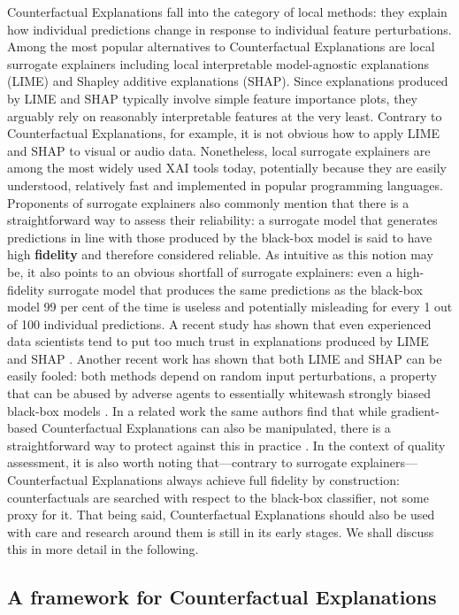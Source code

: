 \documentclass{juliacon}
\begin{document}
Counterfactual Explanations fall into the category of local methods:
they explain how individual predictions change in response to individual
feature perturbations. Among the most popular alternatives to
Counterfactual Explanations are local surrogate explainers including
local interpretable model-agnostic explanations (LIME) and Shapley
additive explanations (SHAP). Since explanations produced by LIME and
SHAP typically involve simple feature importance plots, they arguably
rely on reasonably interpretable features at the very least. Contrary to
Counterfactual Explanations, for example, it is not obvious how to apply
LIME and SHAP to visual or audio data. Nonetheless, local surrogate
explainers are among the most widely used XAI tools today, potentially
because they are easily understood, relatively fast and implemented in
popular programming languages. Proponents of surrogate explainers also
commonly mention that there is a straightforward way to assess their
reliability: a surrogate model that generates predictions in line with
those produced by the black-box model is said to have high
\textbf{fidelity} and therefore considered reliable. As intuitive as
this notion may be, it also points to an obvious shortfall of surrogate
explainers: even a high-fidelity surrogate model that produces the same
predictions as the black-box model 99 per cent of the time is useless
and potentially misleading for every 1 out of 100 individual
predictions. A recent study has shown that even experienced data
scientists tend to put too much trust in explanations produced by LIME
and SHAP \cite{kaur2020interpreting}. Another recent work has shown that
both LIME and SHAP can be easily fooled: both methods depend on random
input perturbations, a property that can be abused by adverse agents to
essentially whitewash strongly biased black-box models
\cite{slack2020fooling}. In a related work the same authors find that
while gradient-based Counterfactual Explanations can also be
manipulated, there is a straightforward way to protect against this in
practice \cite{slack2021counterfactual}. In the context of quality
assessment, it is also worth noting that---contrary to surrogate
explainers---Counterfactual Explanations always achieve full fidelity by
construction: counterfactuals are searched with respect to the black-box
classifier, not some proxy for it. That being said, Counterfactual
Explanations should also be used with care and research around them is
still in its early stages. We shall discuss this in more detail in the
following.

\hypertarget{sec-method}{%
\subsection{A framework for Counterfactual
Explanations}\label{sec-method}}
\end{document}
